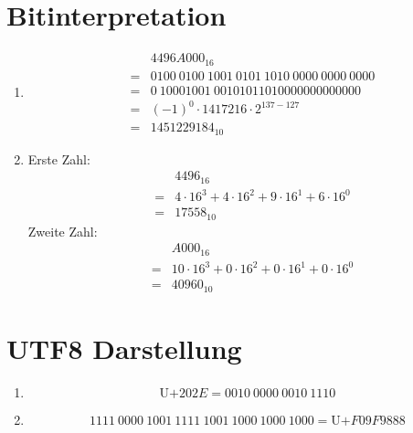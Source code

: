 \documentclass[DIN, pagenumber=false, fontsize=11pt, parskip=half]{scrartcl}
\begin{document}
    \section{Bitinterpretation}
    \begin{enumerate}[label=(\alph*)]
        \item
            \begin{eqnarray*}
                &&{4496A000}_{16} \\&=&
                0100\ 0100\ 1001\ 0101\ 1010\ 0000\ 0000\ 0000 \\&=& 
                0\ 10001001\ 00101011010000000000000 \\&=&
                {(-1)}^0 \cdot 1417216 \cdot 2^{137-127} \\&=&
                {1451229184}_{10}
            \end{eqnarray*}
        \item
            Erste Zahl:
            \begin{eqnarray*}
                &&{4496}_{16} \\&=&
                4 \cdot 16^3 + 4 \cdot 16^2 + 9 \cdot 16^1 + 6 \cdot 16^0 \\&=&
                {17558}_{10}
            \end{eqnarray*}
            Zweite Zahl:
            \begin{eqnarray*}
                &&{A000}_{16} \\&=&
                10 \cdot 16^3 + 0 \cdot 16^2 + 0 \cdot 16^1 + 0 \cdot 16^0 \\&=&
                {40960}_{10}
            \end{eqnarray*}
    \end{enumerate}
    \section{UTF8 Darstellung}
    \begin{enumerate}[label=(\alph*)]
        \item
            \begin{equation*}
                \text{U+}202E = 0010\ 0000\ 0010\ 1110
            \end{equation*}
        \item
            \begin{equation*}
                1111\ 0000\ 1001\ 1111\ 1001\ 1000\ 1000\ 1000 = \text{U+}F09F9888
            \end{equation*}
    \end{enumerate}
\end{document}
